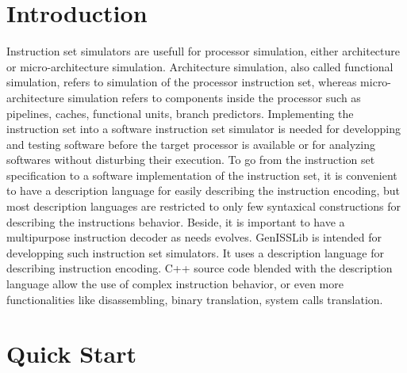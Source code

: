 \section{Introduction}

Instruction set simulators are usefull for processor simulation, either
architecture or micro-architecture simulation. Architecture simulation,
also called functional simulation, refers to simulation of the processor
instruction set, whereas micro-architecture simulation refers to components
inside the processor such as pipelines, caches, functional units, branch
predictors. Implementing the instruction set into a software instruction set
simulator is needed for developping and testing software before the target
processor is available or for analyzing softwares without disturbing their execution.
To go from the instruction set specification to a software
implementation of the instruction set, it is convenient to have a description language
for easily describing the instruction encoding, but most description languages
are restricted to only few syntaxical constructions for describing the
instructions behavior. Beside, it is important to have a multipurpose instruction decoder as needs evolves.
GenISSLib is intended for developping such instruction set simulators. It uses a
description language for describing instruction encoding. C++ source code blended with
the description language allow the use of complex instruction behavior, or even more functionalities
like disassembling, binary translation, system calls translation.

\section{Quick Start}

